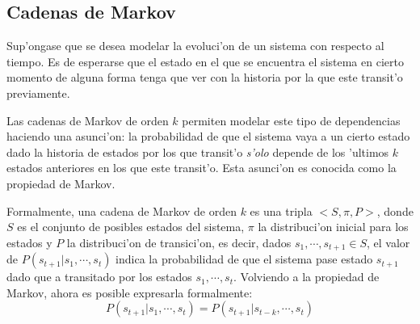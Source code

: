 %
%
%
%
%

\subsection{Cadenas de Markov}
Sup'ongase que se desea modelar la evoluci'on de un sistema con respecto al tiempo. Es de esperarse que 
el estado en el que se encuentra el sistema en cierto momento de alguna forma tenga que ver con la historia por la que este transit'o
previamente. 

Las cadenas de Markov de orden $k$ permiten modelar este tipo de dependencias haciendo una asunci'on: la probabilidad de que el sistema vaya a un cierto estado
dado la historia de estados por los que transit'o \emph{s'olo} depende de los 'ultimos $k$ estados anteriores en los que este transit'o. 
Esta asunci'on es conocida como la propiedad de Markov. 

Formalmente, una cadena de Markov de orden $k$ es una tripla $<S,\pi, P>$, donde $S$ es el conjunto de posibles estados del sistema, $\pi$ la distribuci'on
inicial para los estados y $P$ la 
distribuci'on de transici'on, es decir, dados $s_1, \cdots, s_{t+1} \in S$, el valor de $P(s_{t+1} | s_1, \cdots, s_t)$ indica la probabilidad
de que el sistema pase estado $s_{t+1}$ dado que a transitado por los estados $s_1, \cdots, s_t$. 
Volviendo a la propiedad de Markov, ahora es posible expresarla formalmente: $$P(s_{t+1}|s_1,\cdots,s_t) = P(s_{t+1} | s_{t-k}, \cdots, s_t)$$

